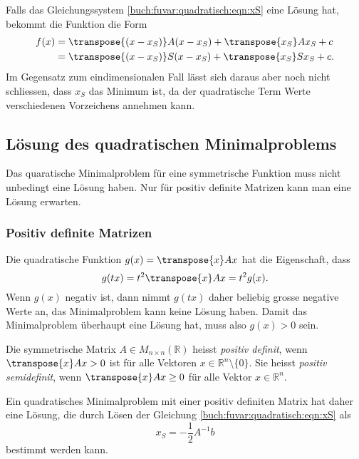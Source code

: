 Falls das Gleichungssystem \eqref{buch:fuvar:quadratisch:eqn:xS} eine Lösung
hat, bekommt die Funktion die Form
\begin{align*}
f(x)
&=
\transpose{(x-x_S)}A(x-x_S) + \transpose{x_S}Ax_S + c
\\
&=
\transpose{(x-x_S)}S(x-x_S) + \transpose{x_S}Sx_S + c.
\end{align*}
Im Gegensatz zum eindimensionalen Fall lässt sich daraus aber noch nicht
schliessen, dass $x_S$ das Minimum ist, da der quadratische Term Werte
verschiedenen Vorzeichens annehmen kann.

%
%
\subsection{Lösung des quadratischen Minimalproblems}
Das quaratische Minimalproblem für eine symmetrische Funktion muss nicht
unbedingt eine Lösung haben.
Nur für positiv definite Matrizen kann man eine Lösung erwarten.

%
%
\subsubsection{Positiv definite Matrizen}
Die quadratische Funktion $g(x)=\transpose{x}Ax$ hat die Eigenschaft,
dass
\[
g(tx)
=
t^2 \transpose{x}Ax
=
t^2 g(x).
\]
Wenn $g(x)$ negativ ist, dann nimmt $g(tx)$ daher beliebig grosse negative
Werte an, das Minimalproblem kann keine Lösung haben.
Damit das Minimalproblem überhaupt eine Lösung hat, muss also
$g(x)>0$ sein.

\begin{definition}
Die symmetrische Matrix $A\in M_{n\times n}(\mathbb{R})$ heisst
{\em positiv definit}, wenn $\transpose{x}Ax>0$ ist für alle Vektoren
$x\in\mathbb{R}^n\setminus\{0\}$.
Sie heisst {\em positiv semidefinit}, wenn $\transpose{x}Ax\ge 0$ für
alle Vektor $x\in\mathbb{R}^n$.
\end{definition}

Ein quadratisches Minimalproblem mit einer positiv definiten Matrix
hat daher eine Lösung, die durch Lösen der Gleichung
\eqref{buch:fuvar:quadratisch:eqn:xS} als
\[
x_S
=
-
\frac12 A^{-1}b
\]
bestimmt werden kann.

%
%
